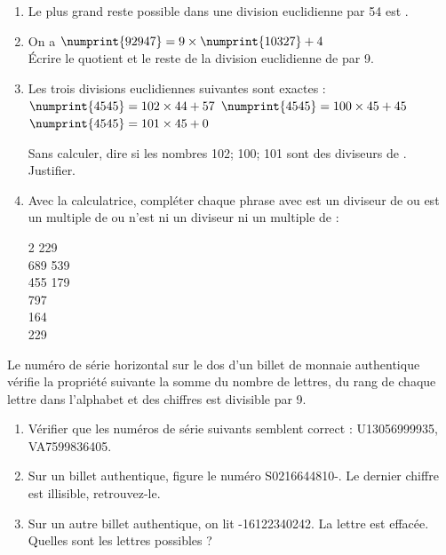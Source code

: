 \documentclass[main.tex]{subfiles}
\begin{document}
\begin{exercise}\hfill 
\begin{enumerate}[label={\alph*)},    leftmargin=*] 
	\item Le plus grand reste possible dans une division euclidienne par 54 est \BoiteFlash{}.
	\item On a $\numprint{92947}=9\times\numprint{10327}  + 4$\\
		Écrire le quotient et le reste de la division euclidienne de  par 9.
		\item Les trois divisions euclidiennes suivantes sont exactes : \\
		$\numprint{4545} = 102 \times 44 + 57$\hfill 
		$\numprint{4545} = 100 \times 45 + 45$\hfill 
		$\numprint{4545} = 101 \times 45 + 0$ \hfill\null 
		 
		Sans calculer, dire si les nombres 102; 100; 101 sont des diviseurs de . Justifier.
		\item Avec la calculatrice, compléter chaque phrase avec \og est un diviseur de\fg{} ou \og est un multiple de\fg{} ou \og n'est ni un diviseur ni un multiple de \fg{} :
		\begin{multicols}{2}
		229 \BoiteFlash{\rule{0cm}{1.6em}\rule{5cm}{0em}} \\
		689 \BoiteFlash{\rule{0cm}{1.6em}\rule{5cm}{0em}}  539\\
		455 \BoiteFlash{\rule{0cm}{1.6em}\rule{5cm}{0em}}  179\\
		 \BoiteFlash{\rule{0cm}{1.6em}\rule{5cm}{0em}}  797\\
		\;\; \BoiteFlash{\rule{0cm}{1.6em}\rule{5cm}{0em}}  164\\
		\; \BoiteFlash{\rule{0cm}{1.6em}\rule{5cm}{0em}} 229
		\end{multicols}
\end{enumerate}
\end{exercise} 
\begin{exercise} \hfill 
	
	Le  numéro de série horizontal sur le dos d'un billet de monnaie authentique vérifie la propriété suivante  \og la somme du nombre de lettres, du rang de chaque lettre dans l'alphabet et des chiffres est divisible par 9\fg{}.
	\begin{enumerate} [label={\alph*)},    leftmargin=*] 
		\item Vérifier que les numéros de série suivants semblent correct : U13056999935, VA7599836405.%
		\item Sur un billet authentique, figure le numéro S0216644810-. Le dernier chiffre est illisible, retrouvez-le.
		\item Sur un autre billet authentique, on lit -16122340242. La lettre est effacée. Quelles sont les lettres possibles ?
	\end{enumerate}
\end{exercise}
\end{document}
